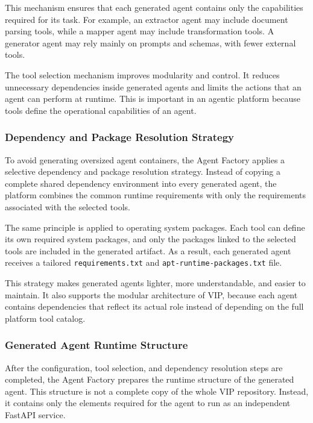 This mechanism ensures that each generated agent contains only the capabilities required for its task. For example, an extractor agent may include document parsing tools, while a mapper agent may include transformation tools. A generator agent may rely mainly on prompts and schemas, with fewer external tools.

The tool selection mechanism improves modularity and control. It reduces unnecessary dependencies inside generated agents and limits the actions that an agent can perform at runtime. This is important in an agentic platform because tools define the operational capabilities of an agent.

\subsubsection{Dependency and Package Resolution Strategy}

To avoid generating oversized agent containers, the Agent Factory applies a selective dependency and package resolution strategy. Instead of copying a complete shared dependency environment into every generated agent, the platform combines the common runtime requirements with only the requirements associated with the selected tools.

The same principle is applied to operating system packages. Each tool can define its own required system packages, and only the packages linked to the selected tools are included in the generated artifact. As a result, each generated agent receives a tailored \texttt{requirements.txt} and \texttt{apt-runtime-packages.txt} file.

This strategy makes generated agents lighter, more understandable, and easier to maintain. It also supports the modular architecture of VIP, because each agent contains dependencies that reflect its actual role instead of depending on the full platform tool catalog.

\subsubsection{Generated Agent Runtime Structure}

After the configuration, tool selection, and dependency resolution steps are completed, the Agent Factory prepares the runtime structure of the generated agent. This structure is not a complete copy of the whole VIP repository. Instead, it contains only the elements required for the agent to run as an independent FastAPI service.

